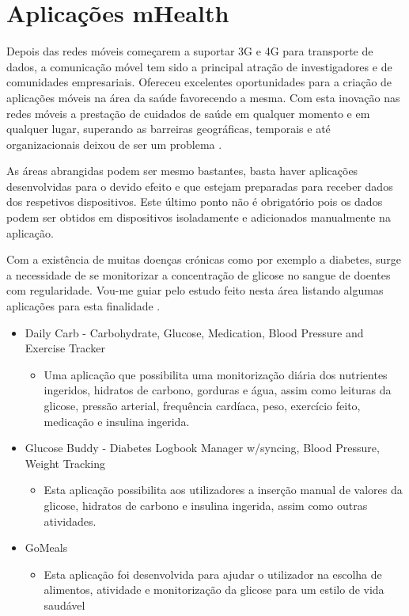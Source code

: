 \documentclass[11pt,twoside,a4paper]{report}
\begin{document}
\section{Aplica\c c\~oes mHealth}

Depois das redes m\'oveis come\c carem a suportar 3G e 4G para transporte de dados, a comunica\c c\~ao m\'ovel tem sido a  principal atra\c c\~ao de investigadores e de comunidades empresariais. Ofereceu excelentes oportunidades para a cria\c c\~ao de  aplica\c c\~oes m\'oveis na \'area da sa\'ude favorecendo a mesma. Com esta inova\c c\~ao nas redes m\'oveis a presta\c c\~ao de cuidados de sa\'ude em qualquer momento e em qualquer lugar, superando as barreiras geogr\'aficas, temporais e at\'e organizacionais deixou de ser um problema \cite{mhealth}.
\par
As \'areas abrangidas podem ser mesmo bastantes, basta haver aplica\c c\~oes desenvolvidas para o devido efeito e que estejam preparadas para receber dados dos respetivos dispositivos. Este \'ultimo ponto não \'e obrigat\'orio pois os dados podem ser obtidos em dispositivos isoladamente e adicionados manualmente na aplica\c c\~ao. 
\par
Com a exist\^encia de muitas doen\c cas cr\'onicas como por exemplo a diabetes, surge a necessidade de se monitorizar a concentra\c c\~ao de glicose no sangue de doentes com regularidade. Vou-me guiar pelo estudo feito nesta \'area listando algumas aplica\c c\~oes para esta finalidade \cite{mhealth}.

\begin{itemize}
  \item Daily Carb - Carbohydrate, Glucose, Medication, Blood Pressure and Exercise Tracker \cite{mhealth_app1}
  \begin{itemize}
    \item Uma aplica\c c\~ao que possibilita uma monitoriza\c c\~ao di\'aria dos nutrientes ingeridos, hidratos de carbono, gorduras e \'agua, assim como leituras da glicose, press\~ao arterial, frequ\^encia card\'iaca, peso, exerc\'icio feito, medica\c c\~ao e insulina ingerida.
  \end{itemize}
  \item Glucose Buddy - Diabetes Logbook Manager w/syncing, Blood Pressure, Weight Tracking \cite{mhealth_app2}
   \begin{itemize}
    \item Esta aplica\c c\~ao possibilita aos utilizadores a inser\c c\~ao manual de valores da glicose, hidratos de carbono e insulina ingerida, assim como outras atividades.
  \end{itemize}
  \item GoMeals \cite{mhealth_app3}
     \begin{itemize}
    \item Esta aplica\c c\~ao foi desenvolvida para ajudar o utilizador na escolha de alimentos, atividade e monitoriza\c c\~ao da glicose  para um  estilo de vida saud\'avel
  \end{itemize}
\end{itemize}
\end{document}
